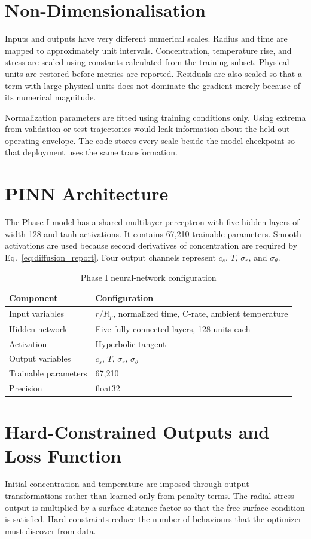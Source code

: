 \documentclass[14pt,a4paper,oneside]{extreport}
\begin{document}
\section{Non-Dimensionalisation}
Inputs and outputs have very different numerical scales. Radius and time are mapped to approximately unit intervals. Concentration, temperature rise, and stress are scaled using constants calculated from the training subset. Physical units are restored before metrics are reported. Residuals are also scaled so that a term with large physical units does not dominate the gradient merely because of its numerical magnitude.

Normalization parameters are fitted using training conditions only. Using extrema from validation or test trajectories would leak information about the held-out operating envelope. The code stores every scale beside the model checkpoint so that deployment uses the same transformation.

\section{PINN Architecture}
\label{sec:method-fifth}
The Phase I model has a shared multilayer perceptron with five hidden layers of width 128 and tanh activations. It contains 67,210 trainable parameters. Smooth activations are used because second derivatives of concentration are required by Eq.~\eqref{eq:diffusion_report}. Four output channels represent $c_s$, $T$, $\sigma_r$, and $\sigma_{\theta}$.

\begin{table}[htbp]
\centering
\caption{Phase I neural-network configuration}
\small
\begin{tabularx}{\textwidth}{p{}X}
\toprule
Component & Configuration\\
\midrule
Input variables & $r/R_p$, normalized time, C-rate, ambient temperature\\
Hidden network & Five fully connected layers, 128 units each\\
Activation & Hyperbolic tangent\\
Output variables & $c_s$, $T$, $\sigma_r$, $\sigma_{\theta}$\\
Trainable parameters & 67,210\\
Precision & float32\\
\bottomrule
\end{tabularx}
\end{table}

\section{Hard-Constrained Outputs and Loss Function}
\label{sec:method-sixth}
Initial concentration and temperature are imposed through output transformations rather than learned only from penalty terms. The radial stress output is multiplied by a surface-distance factor so that the free-surface condition is satisfied. Hard constraints reduce the number of behaviours that the optimizer must discover from data.
\end{document}
